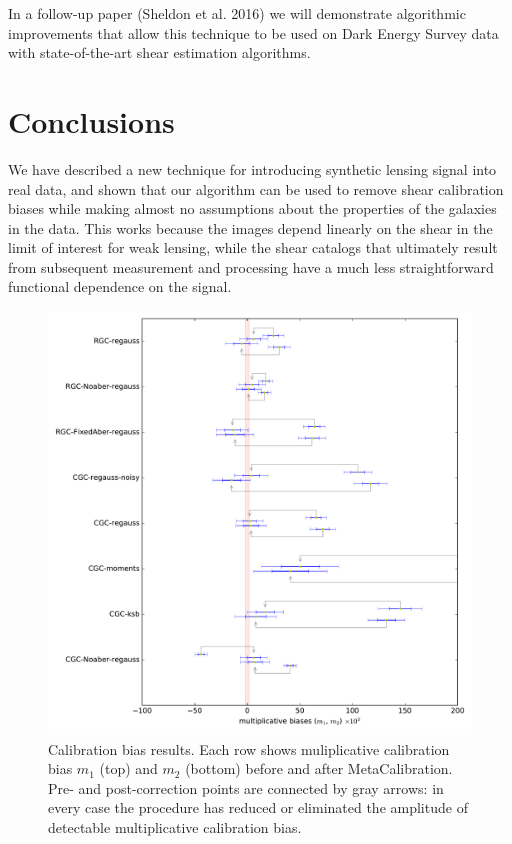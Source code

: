 \documentclass[iop]{emulateapj}
\begin{document}
In a follow-up paper (Sheldon et al. 2016) we will demonstrate
algorithmic improvements that allow this technique to be used on Dark
Energy Survey data with state-of-the-art shear estimation algorithms.

\section{Conclusions}
We have described a new technique for introducing synthetic lensing
signal into real data, and shown that our algorithm can be used to
remove shear calibration biases while making almost no assumptions
about the properties of the galaxies in the data. This works because
the images depend linearly on the shear in the limit of interest for
weak lensing, while the shear catalogs that ultimately result from
subsequent measurement and processing have a much less straightforward
functional dependence on the signal.

\begin{figure}[t]
\begin{center}
\includegraphics[width=0.8\linewidth]{./Plots/m_results_linear.pdf}
\end{center}
\caption{Calibration bias results. Each row shows muliplicative
  calibration bias $m_1$ (top) and $m_2$ (bottom) before and after
  MetaCalibration. Pre- and post-correction points are connected by
  gray arrows: in every case the procedure has reduced or eliminated
  the amplitude of detectable multiplicative calibration bias.}
\end{figure}
\end{document}
